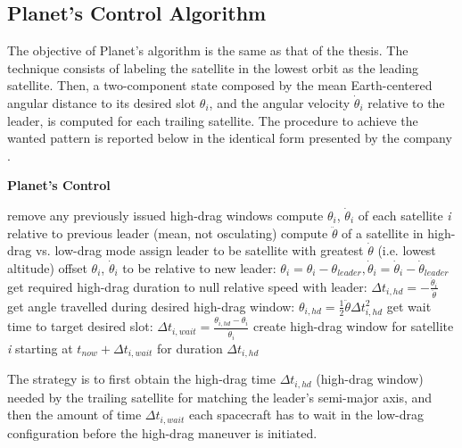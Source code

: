 \begin{itemize}
\subsection{Planet's Control Algorithm} \label{planet_algorithm_par}
The objective of Planet's algorithm is the same as that of the thesis.
The technique consists of labeling the satellite in the lowest orbit as the leading satellite.
Then, a two-component state composed by the mean Earth-centered angular distance to its desired slot $\theta_i$, and the angular velocity $\dot{\theta}_i$ relative to the leader, is computed for each trailing satellite.
The procedure to achieve the wanted pattern is reported below in the identical form presented by the company \cite{foster2015orbit}.

\begin{algorithm}[H]
      \caption{\textbf{Planet's Control}}
      \begin{algorithmic}[1]
                  \State remove any previously issued high-drag windows
                  \State compute $\theta_i$, $\dot{\theta}_i$ of each satellite \textit{i} relative to previous leader (mean, not osculating)
                  \State compute $\ddot{\theta}$ of a satellite in high-drag vs. low-drag mode
                  \State assign leader to be satellite with greatest $\dot{\theta}$ (i.e. lowest altitude)
                        \State offset $\theta_i$, $\dot{\theta}_i$ to be relative to new leader: $\theta_i = \theta_i - \theta_{leader}, \dot{\theta}_i = \dot{\theta}_i - \dot{\theta}_{leader}$
                        \State get required high-drag duration to null relative speed with leader: $\Delta t_{i,hd} = - \frac{\dot{\theta}_i}{\ddot{\theta}}$
                        \State get angle travelled during desired high-drag window: $\theta_{i,hd} = \frac{1}{2} \ddot{\theta} \Delta t_{i,hd}^2$
                        \State get wait time to target desired slot: $\Delta t_{i,wait} = \frac{\theta_{i,hd} - \theta_i}{\dot{\theta}_i}$
                        \State create high-drag window for satellite \textit{i} starting at $t_{now} + \Delta t_{i,wait}$ for duration $\Delta t_{i,hd}$
                  \EndFor
            \EndProcedure
      \end{algorithmic}
\end{algorithm}

The strategy is to first obtain the high-drag time $\Delta t_{i,hd}$ (high-drag window) needed by the trailing satellite for matching the leader's semi-major axis, and then the amount of time $\Delta t_{i,wait}$ each spacecraft has to wait in the low-drag configuration before the high-drag maneuver is initiated.


\end{itemize}
